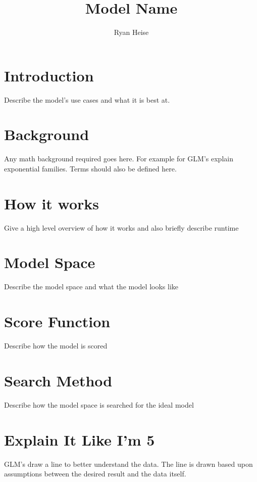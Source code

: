 \documentclass{article}
\title{Model Name}
\author{Ryan Heise}
\begin{document}
\maketitle

\section{Introduction}

Describe the model's use cases and what it is best at. 

\section{Background}

Any math background required goes here. For example for GLM's explain exponential families.
Terms should also be defined here. 

\section{How it works}

Give a high level overview of how it works and also briefly describe runtime




\section{Model Space}

Describe the model space and what the model looks like

\section{Score Function}

Describe how the model is scored


\section{Search Method}

Describe how the model space is searched for the ideal model


\section{Explain It Like I'm 5}

GLM's draw a line to better understand the data. The line is drawn based upon assumptions between the desired result and the data itself.
\end{document}
